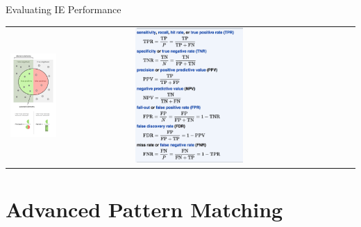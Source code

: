 \documentclass[10pt]{beamer}
\begin{document}
\begin{frame}{Evaluating IE Performance}
\begin{tabular}{p{5cm} p{7cm}}
    \vspace{0pt}
    \includegraphics[width=0.4\textwidth]{figures/precisionrecall.png}
    &
    \vspace{0pt}
    \includegraphics[width=0.5\textwidth]{figures/precisionrecall-formulas.png}
\end{tabular}
\end{frame}

\section{Advanced Pattern Matching}
\end{document}
